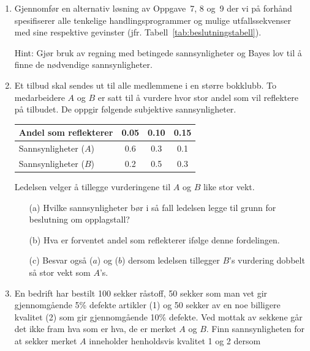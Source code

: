 {{\begin{enumerate}
\begin{itemize}
\item[(a)] Bygg ut beslutningstreet til å omfatte eventuell kjøp
av informasjon.
\item[(b)] Finn den optimale løsning av problemet.
\item[(c)] Lønner det seg nå å spille?
\item[(d)] Hvor mye vil du være villig til å betale for å
           få perfekt informasjon om myntens karakter?
\end{itemize}

\item
Gjennomfør en alternativ løsning av Oppgave~7, 8 og~9 der vi på
forhånd spesifiserer alle tenkelige handlingsprogrammer og mulige
utfallssekvenser med sine respektive gevinster (jfr. Tabell~\ref{tab:beslutningstabell}).

Hint:  Gjør bruk av regning med betingede sannsynligheter og Bayes lov 
til å finne de nødvendige sannsynligheter.

\item
Et tilbud skal sendes ut til alle medlemmene i en større bokklubb.  To
medarbeidere $A$ og $B$ er satt til å vurdere hvor stor andel som vil
reflektere på tilbudet.  De oppgir følgende subjektive sannsynligheter.
\begin{center}
\begin{tabular}{l|ccc}
Andel som reflekterer   &    0.05  &  0.10  &  0.15  \\ \hline
Sannsynligheter ($A$)     &    0.6   &  0.3   &  0.1   \\
Sannsynligheter ($B$)     &    0.2   &  0.5   &  0.3   \\ \hline
\end{tabular}
\end{center}

Ledelsen velger å tillegge vurderingene til $A$ og $B$ like stor vekt.

\begin{itemize}
\item[(a)] Hvilke sannsynligheter bør i så fall ledelsen legge til
           grunn for beslutning om opplagstall?
\item[(b)] Hva er forventet andel som reflekterer ifølge denne fordelingen.
\item[(c)] Besvar også ($a$) og ($b$) dersom ledelsen tillegger 
           $B$'s vurdering dobbelt så stor vekt som $A$'s.
\end{itemize}

\item
En bedrift har bestilt 100 sekker råstoff, 50 sekker som man vet gir
gjennomgående 5\% defekte artikler (1) og 50 sekker av en noe billigere
kvalitet (2) som gir gjennomgående 10\% defekte.  Ved mottak av 
sekkene går det ikke fram hva som er hva, de er merket $A$ og $B$.
Finn sannsynligheten for at sekker merket $A$ inneholder henholdsvis kvalitet
1 og 2 dersom 


\end{enumerate}}}
